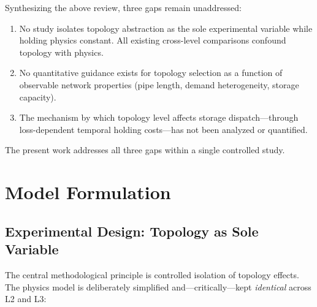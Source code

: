 \documentclass[review,3p]{elsarticle}
\begin{document}
Synthesizing the above review, three gaps remain unaddressed:

\begin{enumerate}
    \item No study isolates topology abstraction as the sole
    experimental variable while holding physics constant. All
    existing cross-level comparisons confound topology with physics.

    \item No quantitative guidance exists for topology selection
    as a function of observable network properties (pipe length,
    demand heterogeneity, storage capacity).

    \item The mechanism by which topology level affects storage
    dispatch---through loss-dependent temporal holding
    costs---has not been analyzed or quantified.
\end{enumerate}

The present work addresses all three gaps within a single controlled
study.

\section{Model Formulation}
\label{sec:model}

\subsection{Experimental Design: Topology as Sole Variable}
\label{sec:exp_design}

The central methodological principle is controlled isolation of
topology effects. The physics model is deliberately simplified
and---critically---kept \emph{identical} across L2 and L3:
\end{document}
